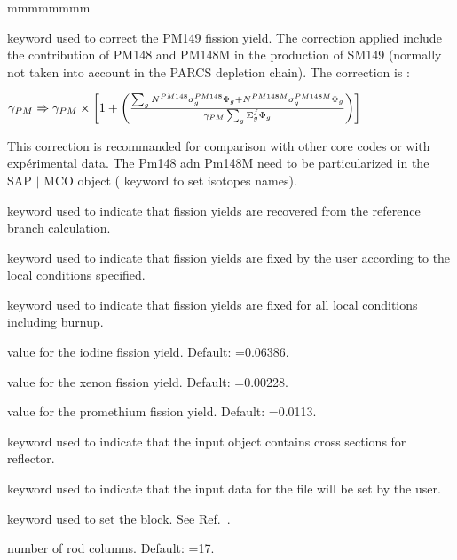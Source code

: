 \begin{ListeDeDescription}{mmmmmmmm}
\item[\moc{COR}] keyword used to correct the PM149 fission yield. The correction applied include the contribution of PM148 and PM148M in the production of SM149 (normally not taken into account in the PARCS depletion chain). The correction is :

${\rm \gamma}_{PM} \Rightarrow {\rm \gamma}_{PM} \times \left[ 1+  \left(  \sum_{g} N^{PM148}\sigma^{PM148}_{g}\Phi_{g}+N^{PM148M}\sigma^{PM148M}_{g}\Phi_{g}\over 
{\rm \gamma}_{PM} \sum_{g}\Sigma^{f}_{g}\Phi_{g}\right)   \right] $

This correction is recommanded for comparison with other core codes or with expérimental data. The Pm148 adn Pm148M need to be particularized in the SAP $\vert$ MCO object ( keyword to set isotopes names).

\item[\moc{REF}] keyword used to indicate that fission yields are recovered from the reference branch calculation. 

\item[\moc{MAN}] keyword used to indicate that fission yields are fixed by the user according to the local conditions specified.

\item[\moc{FIX}] keyword used to indicate that fission yields are fixed for all local conditions including burnup.

\item[\dusa{yldi}] value for the iodine fission yield. Default: =0.06386.

\item[\dusa{yldxe}] value for the xenon fission yield. Default: =0.00228.

\item[\dusa{yldpm}] value for the promethium fission yield. Default: =0.0113.

\item[\moc{REFLECTOR}] keyword used to indicate that the input  object contains cross sections for reflector.

\item[\moc{HELIOS}] keyword used to indicate that the input data for the  file will be set by the user.

\item[\moc{FILE$\_$CONT$\_$1}]  keyword used to set the  block. See Ref.~.

\item[\dusa{ncols}] number of rod columns. Default: =17.


\end{ListeDeDescription}
